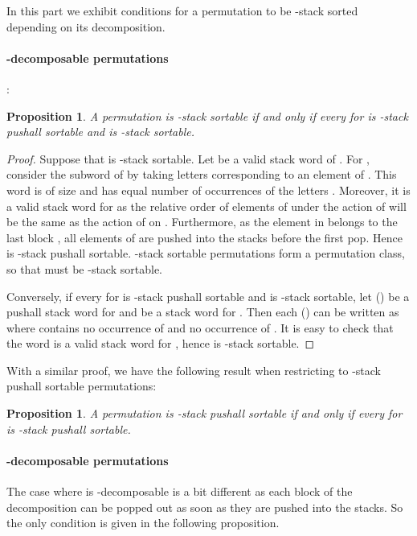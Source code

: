 \documentclass[11pt]{article}
\newtheorem{prop}[thm]{Proposition}
\newcommand{\pushall}{-stack pushall sortable\xspace}
\begin{document}
In this part we exhibit conditions for a permutation  to be -stack sorted depending on its decomposition. 

\paragraph{-decomposable permutations}: 
\begin{prop}\label{prop:2stacksMoinsDecomposable}
A permutation  is -stack sortable if and only if every  for  is -stack pushall sortable and  is -stack sortable.
\end{prop}
\begin{proof}
Suppose that  is -stack sortable. Let  be a valid stack word of .
For , consider the subword  of  by taking letters corresponding to an element of . 
This word is of size  and has equal number of occurrences of the letters . 
Moreover, it is a valid stack word for  as the relative order of elements of  under the action of  will be the same as the action of  on . 
Furthermore, as the element  in  belongs to the last block , all elements of  are pushed into the stacks before the first pop. 
Hence  is -stack pushall sortable. 
-stack sortable permutations form a permutation class, so that  must be -stack sortable.

Conversely, if every  for  is -stack pushall sortable and  is -stack sortable, let  () be a pushall stack word for  and  be a stack word for . 
Then each  () can be written as  where  contains no occurrence of  and  no occurrence of .
It is easy to check that the word  is a valid stack word for , hence  is -stack sortable.
\end{proof}

With a similar proof, we have the following result when restricting to \pushall permutations:

\begin{prop}\label{prop:pushallMoinsDecomposable}
A permutation  is \pushall if and only if every  for  is -stack pushall sortable.
\end{prop}

\paragraph{-decomposable permutations}

The case where  is -decomposable is a bit different as each block of the decomposition can be popped out as soon as they are pushed into the stacks. 
So the only condition is given in the following proposition.
\end{document}
